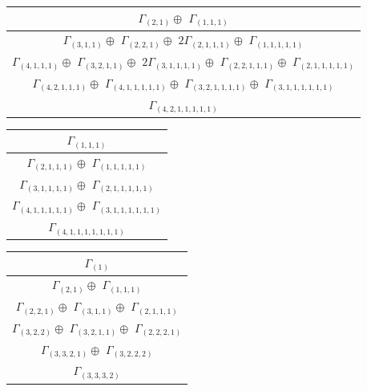 \documentclass[main.tex]{subfiles}
\begin{document}
\bigskip
\begin{minipage}{.7\textwidth}
\centering
\begin{tabular}{c}
$\Gamma_{(
2 , 
1
)} \oplus$
$\Gamma_{(
1 , 
1 , 
1
)}$
\\ \hline
$\Gamma_{(
3 , 
1 , 
1
)} \oplus$
$\Gamma_{(
2 , 
2 , 
1
)} \oplus$
$2\Gamma_{(
2 , 
1 , 
1 , 
1
)} \oplus$
$\Gamma_{(
1 , 
1 , 
1 , 
1 , 
1
)}$
\\ \hline
$\Gamma_{(
4 , 
1 , 
1 , 
1
)} \oplus$
$\Gamma_{(
3 , 
2 , 
1 , 
1
)} \oplus$
$2\Gamma_{(
3 , 
1 , 
1 , 
1 , 
1
)} \oplus$
$\Gamma_{(
2 , 
2 , 
1 , 
1 , 
1
)} \oplus$
$\Gamma_{(
2 , 
1 , 
1 , 
1 , 
1 , 
1
)}$
\\ \hline
$\Gamma_{(
4 , 
2 , 
1 , 
1 , 
1
)} \oplus$
$\Gamma_{(
4 , 
1 , 
1 , 
1 , 
1 , 
1
)} \oplus$
$\Gamma_{(
3 , 
2 , 
1 , 
1 , 
1 , 
1
)} \oplus$
$\Gamma_{(
3 , 
1 , 
1 , 
1 , 
1 , 
1 , 
1
)}$
\\ \hline
$\Gamma_{(
4 , 
2 , 
1 , 
1 , 
1 , 
1 , 
1
)}$
\\
\end{tabular}\end{minipage}
\begin{minipage}{.3\textwidth}
\centering
\begin{tabular}{c}
$\Gamma_{(
1 , 
1 , 
1
)}$
\\ \hline
$\Gamma_{(
2 , 
1 , 
1 , 
1
)} \oplus$
$\Gamma_{(
1 , 
1 , 
1 , 
1 , 
1
)}$
\\ \hline
$\Gamma_{(
3 , 
1 , 
1 , 
1 , 
1
)} \oplus$
$\Gamma_{(
2 , 
1 , 
1 , 
1 , 
1 , 
1
)}$
\\ \hline
$\Gamma_{(
4 , 
1 , 
1 , 
1 , 
1 , 
1
)} \oplus$
$\Gamma_{(
3 , 
1 , 
1 , 
1 , 
1 , 
1 , 
1
)}$
\\ \hline
$\Gamma_{(
4 , 
1 , 
1 , 
1 , 
1 , 
1 , 
1 , 
1
)}$
\\
\end{tabular}\end{minipage}
\bigskip
\begin{minipage}{.4\textwidth}
\centering
\begin{tabular}{c}
$\Gamma_{(
1
)}$
\\ \hline
$\Gamma_{(
2 , 
1
)} \oplus$
$\Gamma_{(
1 , 
1 , 
1
)}$
\\ \hline
$\Gamma_{(
2 , 
2 , 
1
)} \oplus$
$\Gamma_{(
3 , 
1 , 
1
)} \oplus$
$\Gamma_{(
2 , 
1 , 
1 , 
1
)}$
\\ \hline
$\Gamma_{(
3 , 
2 , 
2
)} \oplus$
$\Gamma_{(
3 , 
2 , 
1 , 
1
)} \oplus$
$\Gamma_{(
2 , 
2 , 
2 , 
1
)}$
\\ \hline
$\Gamma_{(
3 , 
3 , 
2 , 
1
)} \oplus$
$\Gamma_{(
3 , 
2 , 
2 , 
2
)}$
\\ \hline
$\Gamma_{(
3 , 
3 , 
3 , 
2
)}$
\\
\end{tabular}\end{minipage}
\end{document}
